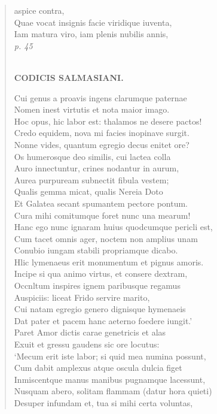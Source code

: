 \documentclass[11pt, a4paper]{report}
\begin{document}
\begin{verse}
aspice contra, \\ Quae vocat insignis facie viridique iuventa, \\ Iam matura viro, iam plenis nubilis annis, \\ \textit{p. 45} \\ 
        ﻿\pagebreak 
    \begin{center} \textbf{CODICIS SALMASIANI.} \end{center} \marginpar{[81]} Cui genus a proavis ingens clarumque paternae \\ Nomen inest virtutis et nota maior imago. \\ Hoc opus, hic labor est: thalamos ne desere pactos! \\ Credo equidem, nova mi facies inopinave surgit. \\ Nonne vides, quantum egregio decus enitet ore? \\ Os humerosque deo similis, cui lactea colla \\ Auro innectuntur, crines nodantur in aurum, \\ Aurea purpuream subnectit fibula vestem; \\ Qualis gemma micat, qualis Nereia Doto \\ Et Galatea secant spumantem pectore pontum. \\ Cura mihi comitumque foret nunc una mearum! \\ Hanc ego nunc ignaram huius quodcumque pericli est, \\ Cum tacet omnis ager, noctem non amplius unam \\ Conubio iungam stabili propriamque dicabo. \\ Hlic lymenaeus erit monumentum et pignus amoris. \\ Incipe si qua animo virtus, et consere dextram, \\ Occnltum inspires ignem paribusque regamus \\ Auspiciis: liceat Frido servire marito, \\ Cui natam egregio genero dignisque hymenaeis \\ Dat pater et pacem hanc aeterno foedere iungit.’ \\ Paret Amor dictis carae genetricis et alas \\ Exuit et gressu gaudens sic ore locutus: \\ ‘Mecum erit iste labor; si quid mea numina possunt, \\ Cum dabit amplexus atque oscula dulcia figet \\ Inmiscentque manus manibus pugnamque lacessunt, \\ Nusquam abero, solitam flammam (datur hora quieti) \\ Desuper infundam et, tua si mihi certa voluntas, \\ 

\end{verse}
\end{document}

